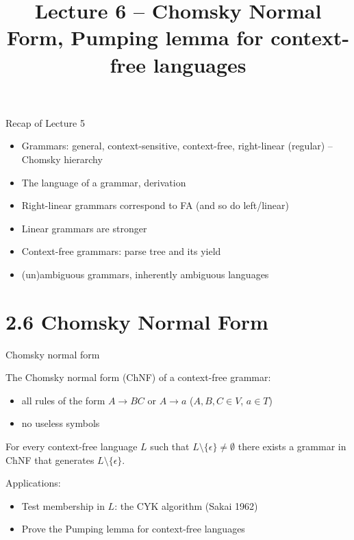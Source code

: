 \documentclass[handout]{beamer}
\title{Lecture 6 -- Chomsky Normal Form, Pumping lemma for context-free languages}
\begin{document}
\frame{\titlepage}


\begin{frame}{Recap of Lecture 5}
	
	\begin{itemize}
		\item Grammars: general, context-sensitive, context-free, right-linear (regular) -- Chomsky hierarchy
		\item The language of a grammar, derivation
		\item Right-linear grammars correspond to FA (and so do left/linear)
		\item Linear grammars are stronger
		\item Context-free grammars: parse tree and its yield
		\item (un)ambiguous grammars, inherently ambiguous languages
	\end{itemize}

\end{frame}


\section{2.6 Chomsky Normal Form}


\begin{frame}{Chomsky normal form}
	
	The \alert{Chomsky normal form (ChNF)} of a context-free grammar:
	
	\begin{itemize}
		\item all rules of the form \alert{$A\rightarrow BC$} or  \alert{$A\rightarrow a$} ($A,B,C\in V$, $a\in T$)
		\item no \alert{useless} symbols
	\end{itemize}

	\begin{theorem}
		For every context-free language $L$ such that $L\setminus \{\epsilon\}\neq \emptyset$ there exists a grammar in ChNF that generates $L\setminus \{\epsilon\}$.
	\end{theorem}
	
	Applications:
	
	\begin{itemize}
		\item Test membership in $L$: the \alert{CYK algorithm} (Sakai 1962) 
		\item Prove the \alert{Pumping lemma for context-free languages}
	\end{itemize}

\end{frame}
\end{document}
